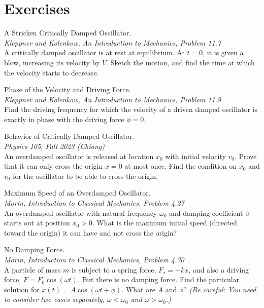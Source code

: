 \documentclass[11pt]{article}
\theoremstyle{gangnamstyle}{\newtheorem{definition}{Definition}[]}
\theoremstyle{gangnamstyle}{\newtheorem{example}{Example}[]}
\theoremstyle{gangnamstyle}{\newtheorem{problem}{Problem}[]}
\theoremstyle{gangnamstyle}{\newtheorem{warning}{Warning}[]}
\begin{document}
\section{Exercises}

\begin{problem}
A Stricken Critically Damped Oscillator. \\
\textit{Kleppner and Kolenkow, An Introduction to Mechanics, Problem 11.7} \\
A critically damped oscillator is at rest at equilibrium. At $t = 0$, it is given a blow, increasing its velocity by $V$. Sketch the motion, and find the time at which the velocity starts to decrease.
\end{problem}

\begin{problem}
Phase of the Velocity and Driving Force. \\
\textit{Kleppner and Kolenkow, An Introduction to Mechanics, Problem 11.9} \\
Find the driving frequency for which the velocity of a driven damped oscillator is exactly in phase with the driving force $\phi = 0$.
\end{problem}

\begin{problem}
Behavior of Critically Damped Oscillator. \\
\textit{Physics 105, Fall 2023 (Chiang)} \\
An overdamped oscillator is released at location $x_0$ with initial velocity $v_0$. Prove that it can only cross the origin $x = 0$ at most once. Find the condition on $x_0$ and $v_0$ for the oscillator to be able to cross the origin. 
\end{problem}

\begin{problem}
Maximum Speed of an Overdamped Oscillator. \\
\textit{Morin, Introduction to Classical Mechanics, Problem 4.27} \\
An overdamped oscillator with natural frequency $\omega_0$ and damping coefficient $\beta$ starts out at position $x_0 > 0$. What is the maximum initial speed (directed toward the origin) it can have and not cross the origin?
\end{problem}

\begin{problem}
No Damping Force. \\
\textit{Morin, Introduction to Classical Mechanics, Problem 4.30} \\
A particle of mass $m$ is subject to a spring force, $F_s = -kx$, and also a driving force, $F = F_0\cos(\omega t)$. But there is no damping force. Find the particular solution for $x(t) = A\cos(\omega t + \phi)$. What are $A$ and $\phi$? \textit{(Be careful: You need to consider two cases separately, $\omega < \omega_0$ and $\omega > \omega_0$.)}
\end{problem}
\end{document}
